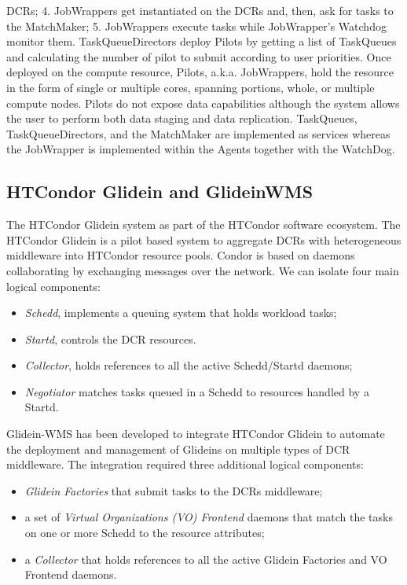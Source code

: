 DCRs; 4. JobWrappers get instantiated on the DCRs and, then,  ask for tasks to the MatchMaker; 5. JobWrappers execute tasks while JobWrapper’s Watchdog monitor them.
TaskQueueDirectors deploy Pilots by getting a list of TaskQueues and calculating the number of pilot to submit  according to user priorities.
Once deployed on the compute resource, Pilots, a.k.a. JobWrappers, hold the resource in the form of single or multiple cores, spanning portions, whole, or multiple compute nodes. Pilots do not expose data capabilities although the system allows the user to perform both data staging and data replication. 
TaskQueues, TaskQueueDirectors, and the MatchMaker are implemented as services whereas the JobWrapper is implemented within the Agents together with the WatchDog. 

\subsection{HTCondor Glidein and GlideinWMS}
The HTCondor Glidein system  as part of the HTCondor software ecosystem. The HTCondor Glidein is a pilot based system to aggregate DCRs with heterogeneous middleware into HTCondor resource pools.
Condor is based on daemons collaborating by exchanging messages over the network. We can isolate four main logical components:
\begin{itemize}
\item \emph{Schedd}, implements a queuing system that holds workload tasks;
\item \emph{Startd}, controls the DCR resources. 
\item \emph{Collector}, holds references to all the active
Schedd/Startd daemons; 
\item \emph{Negotiator} matches tasks queued in a Schedd to resources handled by a Startd.
\end{itemize}
Glidein-WMS has been developed to integrate HTCondor Glidein to  automate the deployment and management of Glideins on multiple types of DCR middleware. 
The integration required three additional logical components: 
\begin{itemize}
\item \emph{Glidein Factories} that submit tasks to the DCRs middleware;
\item a set of \emph{Virtual Organizations (VO) Frontend} daemons that match the tasks on one or more Schedd to the resource attributes;
\item a \emph{Collector} that holds references to all the active Glidein Factories and VO Frontend daemons. 
\end{itemize}

